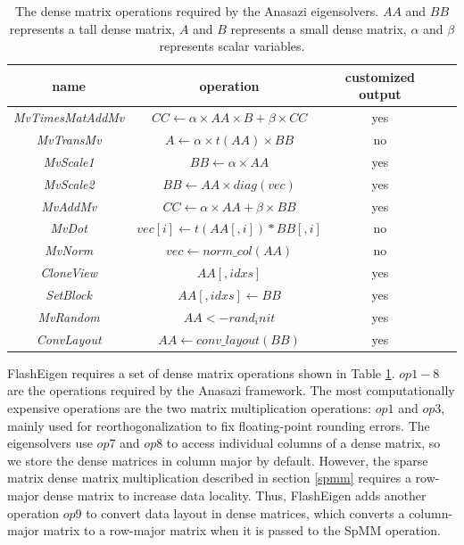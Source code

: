 \begin{table}
	\begin{center}
		\small
		\begin{tabular}{|c|c|c|c|c|}
			\hline
			name & operation & customized output \\
			\hline
			\textit{MvTimesMatAddMv} & $CC \leftarrow \alpha \times AA \times B + \beta \times CC$ & yes \\
			\hline
			\textit{MvTransMv} & $A \leftarrow \alpha \times t(AA) \times BB$ & no \\
			\hline
			\textit{MvScale1} & $BB \leftarrow \alpha \times AA$ & yes \\
			\hline
			\textit{MvScale2} & $BB \leftarrow AA \times diag(vec)$ & yes \\
			\hline
			\textit{MvAddMv} & $CC \leftarrow \alpha \times AA + \beta \times BB$ & yes \\
			\hline
			\textit{MvDot} & $vec[i] \leftarrow t(AA[,i]) * BB[,i]$ & no \\
			\hline
			\textit{MvNorm} & $vec \leftarrow norm\_col(AA)$ & no \\
			\hline
			\textit{CloneView} & $AA[,idxs]$ & yes \\
			\hline
			\textit{SetBlock} & $AA[,idxs] \leftarrow BB$ & yes \\
			\hline
			\textit{MvRandom} & $AA <- rand_init$ & yes \\
			\hline
			\textit{ConvLayout} & $AA \leftarrow conv\_layout(BB)$ & yes \\
			\hline
		\end{tabular}
		\normalsize
	\end{center}
	\caption{The dense matrix operations required by the Anasazi eigensolvers.
		$AA$ and $BB$ represents a tall dense matrix, $A$ and $B$ represents
		a small dense matrix, $\alpha$ and $\beta$ represents scalar variables.}
	\label{anasazi_ops}
\end{table}

FlashEigen requires a set of dense matrix operations shown in Table
\ref{anasazi_ops}. $op1-8$ are the operations required by the Anasazi
framework. The most computationally expensive operations are the two
matrix multiplication operations: $op1$ and $op3$, mainly used for
reorthogonalization to fix floating-point rounding errors. The eigensolvers
use $op7$ and $op8$ to access individual columns of a dense matrix,
so we store the dense matrices in column major by default.
However, the sparse matrix dense matrix multiplication described in section
\ref{spmm} requires a row-major dense matrix to increase data locality.
Thus, FlashEigen adds another operation $op9$ to convert data layout
in dense matrices, which converts a column-major matrix to a row-major
matrix when it is passed to the SpMM operation.

